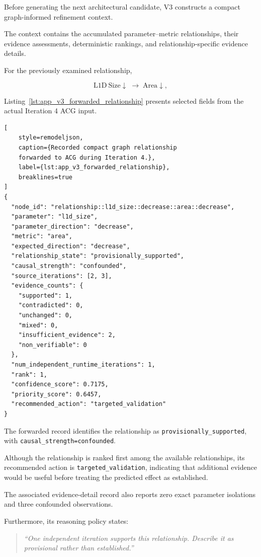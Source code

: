 Before generating the next architectural
candidate, V3 constructs a compact
graph-informed refinement context.

The context contains the accumulated
parameter--metric relationships,
their evidence assessments, deterministic
rankings, and relationship-specific
evidence details.

For the previously examined relationship,

\begin{equation}
\mathrm{L1D\ Size}\downarrow
\;\rightarrow\;
\mathrm{Area}\downarrow,
\end{equation}

Listing~\ref{lst:app_v3_forwarded_relationship}
presents selected fields from the
actual Iteration 4 ACG input.

\begin{lstlisting}[
    style=remodeljson,
    caption={Recorded compact graph relationship
    forwarded to ACG during Iteration 4.},
    label={lst:app_v3_forwarded_relationship},
    breaklines=true
]
{
  "node_id": "relationship::l1d_size::decrease::area::decrease",
  "parameter": "l1d_size",
  "parameter_direction": "decrease",
  "metric": "area",
  "expected_direction": "decrease",
  "relationship_state": "provisionally_supported",
  "causal_strength": "confounded",
  "source_iterations": [2, 3],
  "evidence_counts": {
    "supported": 1,
    "contradicted": 0,
    "unchanged": 0,
    "mixed": 0,
    "insufficient_evidence": 2,
    "non_verifiable": 0
  },
  "num_independent_runtime_iterations": 1,
  "rank": 1,
  "confidence_score": 0.7175,
  "priority_score": 0.6457,
  "recommended_action": "targeted_validation"
}
\end{lstlisting}

The forwarded record identifies the
relationship as
\texttt{provisionally\_supported},
with \texttt{causal\_strength=confounded}.

Although the relationship is ranked
first among the available relationships,
its recommended action is
\texttt{targeted\_validation},
indicating that additional evidence
would be useful before treating the
predicted effect as established.

The associated evidence-detail record
also reports zero exact parameter
isolations and three confounded
observations.

Furthermore, its reasoning policy states:

\begin{quote}
\emph{``One independent iteration supports
this relationship. Describe it as
provisional rather than established.''}
\end{quote}

